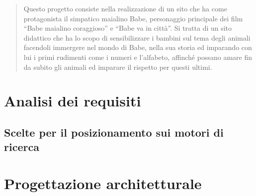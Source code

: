 \documentclass[10pt,a4paper,onecolumn]{article}
\begin{document}
\clearpage

\tableofcontents

\clearpage 

\begin{abstract}
Questo progetto consiste nella realizzazione di un sito che ha come protagonista il simpatico maialino Babe, personaggio principale dei film ``Babe maialino coraggioso'' e ``Babe va in città''.
Si tratta di un sito didattico che ha lo scopo di sensibilizzare i bambini sul tema degli animali facendoli immergere nel mondo di Babe, nella sua storia ed imparando con lui i primi rudimenti come i numeri e l'alfabeto, affinché possano amare fin da subito gli animali ed imparare il rispetto per questi ultimi.
\end{abstract}

\clearpage

\section{Analisi dei requisiti}



\subsection{Scelte per il posizionamento sui motori di ricerca}

\section{Progettazione architetturale}
\end{document}
